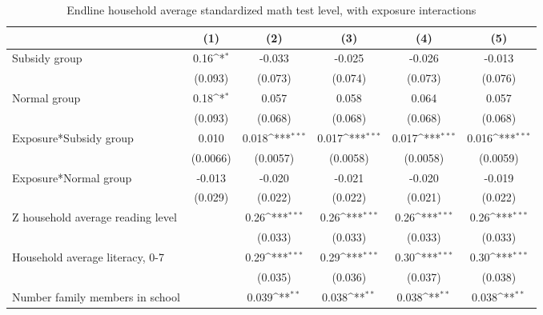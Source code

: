 \begin{table}[htbp]\centering
\def\sym#1{\ifmmode^{#1}\else\(^{#1}\)\fi}
\caption{Endline household average standardized math test level, with exposure interactions}
\begin{tabular*}{1\hsize}{@{\hskip\tabcolsep\extracolsep\fill}l*{5}{c}}
\toprule
                &\multicolumn{1}{c}{(1)}         &\multicolumn{1}{c}{(2)}         &\multicolumn{1}{c}{(3)}         &\multicolumn{1}{c}{(4)}         &\multicolumn{1}{c}{(5)}         \\
\midrule
Subsidy group   &     0.16\sym{*}  &   -0.033         &   -0.025         &   -0.026         &   -0.013         \\
                &  (0.093)         &  (0.073)         &  (0.074)         &  (0.073)         &  (0.076)         \\
Normal group    &     0.18\sym{*}  &    0.057         &    0.058         &    0.064         &    0.057         \\
                &  (0.093)         &  (0.068)         &  (0.068)         &  (0.068)         &  (0.068)         \\
Exposure*Subsidy group&    0.010         &    0.018\sym{***}&    0.017\sym{***}&    0.017\sym{***}&    0.016\sym{***}\\
                & (0.0066)         & (0.0057)         & (0.0058)         & (0.0058)         & (0.0059)         \\
Exposure*Normal group&   -0.013         &   -0.020         &   -0.021         &   -0.020         &   -0.019         \\
                &  (0.029)         &  (0.022)         &  (0.022)         &  (0.021)         &  (0.022)         \\
Z household average reading level&                  &     0.26\sym{***}&     0.26\sym{***}&     0.26\sym{***}&     0.26\sym{***}\\
                &                  &  (0.033)         &  (0.033)         &  (0.033)         &  (0.033)         \\
Household average literacy, 0-7&                  &     0.29\sym{***}&     0.29\sym{***}&     0.30\sym{***}&     0.30\sym{***}\\
                &                  &  (0.035)         &  (0.036)         &  (0.037)         &  (0.038)         \\
Number family members in school&                  &    0.039\sym{**} &    0.038\sym{**} &    0.038\sym{**} &    0.038\sym{**} \\

\end{tabular*}
\end{table}
